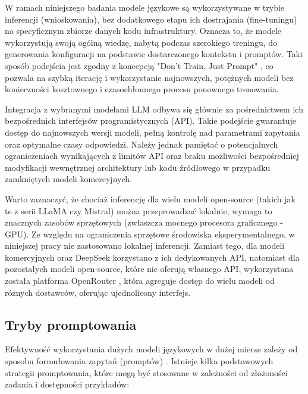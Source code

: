 W ramach niniejszego badania modele językowe są wykorzystywane w trybie inferencji (wnioskowania), bez dodatkowego etapu ich dostrajania (fine-tuningu) na specyficznym zbiorze danych kodu infrastruktury. Oznacza to, że modele wykorzystują swoją ogólną wiedzę, nabytą podczas szerokiego treningu, do generowania konfiguracji na podstawie dostarczonego kontekstu i promptów. Taki sposób podejścia jest zgodny z koncepcją "Don't Train, Just Prompt" \cite{kratzke_dont_2024}, co pozwala na szybką iterację i wykorzystanie najnowszych, potężnych modeli bez konieczności kosztownego i czasochłonnego procesu ponownego trenowania.

Integracja z wybranymi modelami LLM odbywa się głównie za pośrednictwem ich bezpośrednich interfejsów programistycznych (API). Takie podejście gwarantuje dostęp do najnowszych wersji modeli, pełną kontrolę nad parametrami zapytania oraz optymalne czasy odpowiedzi. Należy jednak pamiętać o potencjalnych ograniczeniach wynikających z limitów API oraz braku możliwości bezpośredniej modyfikacji wewnętrznej architektury lub kodu źródłowego w przypadku zamkniętych modeli komercyjnych.

Warto zaznaczyć, że chociaż inferencję dla wielu modeli open-source (takich jak te z serii LLaMA czy Mistral) można przeprowadzać lokalnie, wymaga to znacznych zasobów sprzętowych (zwłaszcza mocnego procesora graficznego - GPU). Ze względu na ograniczenia sprzętowe środowiska eksperymentalnego, w niniejszej pracy nie zastosowano lokalnej inferencji. Zamiast tego, dla modeli komercyjnych oraz DeepSeek korzystano z ich dedykowanych API, natomiast dla pozostałych modeli open-source, które nie oferują własnego API, wykorzystana została platforma OpenRouter \cite{openrouter}, która agreguje dostęp do wielu modeli od różnych dostawców, oferując ujednolicony interfejs.

\subsection{Tryby promptowania}

Efektywność wykorzystania dużych modeli językowych w dużej mierze zależy od sposobu formułowania zapytań (promptów) \cite{kratzke_dont_2024}. Istnieje kilka podstawowych strategii promptowania, które mogą być stosowane w zależności od złożoności zadania i dostępności przykładów:

